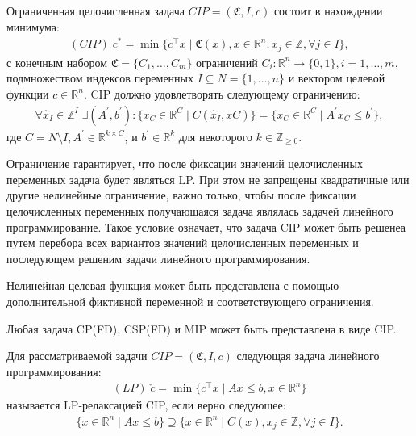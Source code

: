 \documentclass[%
	11pt,
	a4paper,
	utf8,
		]{article}
\begin{document}
\begin{definition}
	Ограниченная целочисленная задача $CIP=(\mathfrak{C}, I, c)$ состоит в нахождении минимума:
	\begin{align*}
		(CIP)\;c^{*}=\min\{c^{\intercal}x\mid \mathfrak{C}(x), x\in\mathbb{R}^{n}, x_j\in\mathbb{Z},\forall j\in I\},
	\end{align*}
	с конечным набором $\mathfrak{C}=\{C_1,\ldots,C_m\}$ ограничений $C_i: \mathbb{R}^{n}\rightarrow\{0, 1\}, i=1,\ldots, m$, подмножеством индексов переменных $ I\subseteq N=\{1,\ldots, n\}$ и вектором целевой функции $c\in\mathbb{R}^{n}$.
	CIP должно удовлетворять следующему ограничению:
	\begin{align}
		\forall \hat{x}_I\in \mathbb{Z}^{I}\;\exists(A^{\prime}, b^{\prime}): \{x_C\in \mathbb{R}^{C}\mid C(\hat{x}_I, xC )\} = \{x_C\in \mathbb{R}^{C}\mid A^{\prime}x_C\le b^{\prime}\}, 
	\end{align}
	где  $C=N\setminus I, A^{\prime}\in \mathbb{R}^{k\times C}$, и $b^{\prime}\in \mathbb{R}^{k}$ для некоторого $k\in \mathbb{Z}_{\ge0}$.
\end{definition}

Ограничение гарантирует, что после фиксации значений целочисленных переменных задача будет являться LP. При этом не запрещены квадратичные или другие нелинейные ограничение, важно только, чтобы после фиксации целочисленных переменных получающаяся задача являлась задачей линейного программирование. Такое условие означает, что задача CIP может быть решенеа путем перебора всех вариантов значений целочисленных переменных и последующем решеним задачи линейного программирования. 

Нелинейная целевая функция может быть представлена с помощью дополнительной фиктивной переменной и соответствующего ограничения. 

Любая задача CP(FD), CSP(FD) и MIP может быть представлена в виде CIP.

\begin{definition}
	Для рассматриваемой задачи $CIP=(\mathfrak{C}, I, c)$ следующая задача линейного программирования:
	\begin{align*}
		(LP)\;\check{c}=\min\{c^{\intercal}x\mid Ax\le b, x\in \mathbb{R}^{n}\}
	\end{align*}
	называется LP-релаксацией CIP, если верно следующее:
	\begin{align*}
		\{x\in\mathbb{R}^{n}\mid Ax\le b\}\supseteq\{x\in \mathbb{R}^{n}\mid C(x), x_j\in\mathbb{Z},\forall j\in I\}.
	\end{align*}
\end{definition}
\end{document}
